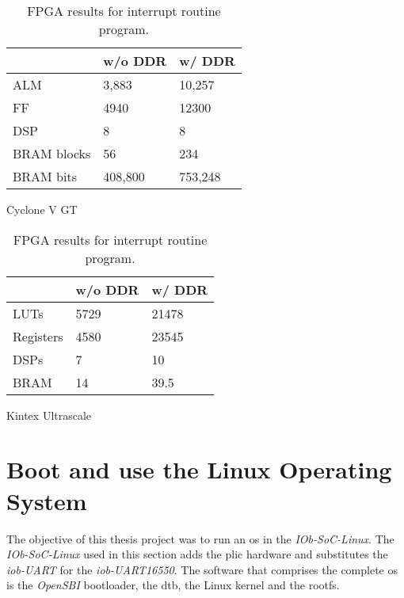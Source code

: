 \begin{table}[!ht]
    \begin{subtable}[h]{0.45\textwidth}
        \centering
        \begin{tabular}{l|l|l|}
            \cline{2-3}
                                              & w/o DDR  & w/ DDR  \\ \hline
            \multicolumn{1}{|l|}{ALM}         & 3,883    & 10,257  \\ \hline
            \multicolumn{1}{|l|}{FF}          & 4940     & 12300   \\ \hline
            \multicolumn{1}{|l|}{DSP}         & 8        & 8       \\ \hline
            \multicolumn{1}{|l|}{BRAM blocks} & 56       & 234     \\ \hline
            \multicolumn{1}{|l|}{BRAM bits}   & 408,800  & 753,248 \\ \hline
        \end{tabular}
       \caption{Cyclone V GT}
       \label{tab:cyclone_int}
    \end{subtable}
    \hfill
    \begin{subtable}[h]{0.45\textwidth}
        \centering
        \begin{tabular}{l|l|l|}
            \cline{2-3}
                                            & w/o DDR  & w/ DDR \\ \hline
            \multicolumn{1}{|l|}{LUTs}      & 5729     & 21478  \\ \hline
            \multicolumn{1}{|l|}{Registers} & 4580     & 23545  \\ \hline
            \multicolumn{1}{|l|}{DSPs}      & 7        & 10     \\ \hline
            \multicolumn{1}{|l|}{BRAM}      & 14       & 39.5   \\ \hline
        \end{tabular}
        \caption{Kintex Ultrascale}
        \label{tab:kintex_int}
     \end{subtable}
     \caption{FPGA results for interrupt routine program.}
     \label{tab:fpga_int}
\end{table}


\section{Boot and use the Linux Operating System}
\label{section:boot_linux}
The objective of this thesis project was to run an \acrlong{os} in the \textit{IOb-SoC-Linux}. The \textit{IOb-SoC-Linux} used in this section adds the \acrshort{plic} hardware and substitutes the \textit{iob-UART} for the \textit{iob-UART16550}. The software that comprises the complete \acrshort{os} is the \textit{OpenSBI} bootloader, the \acrlong{dtb}, the Linux kernel and the \acrlong{rootfs}.

